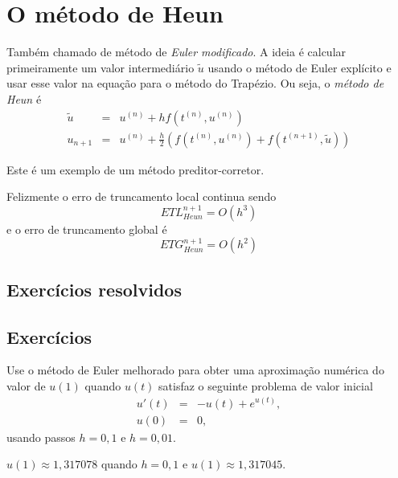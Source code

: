 \emconstrucao


\section{O método de Heun}
Também chamado de método de \emph{Euler modificado}. A ideia é calcular primeiramente um valor intermediário $\tilde{u}$ usando o método de Euler expl\'icito e usar esse valor na equação para o método do Trapézio. Ou seja, o \emph{método de Heun} é
\begin{eqnarray}
  \tilde{u} &=& u^{(n)} +   h f(t^{(n)},u^{(n)}) \\
  u_{n+1}   &=& u^{(n)} +  \frac{h}{2} \left(f(t^{(n)},u^{(n)})+f(t^{(n+1)},\tilde{u})\right)
\end{eqnarray}

Este é um exemplo de um método preditor-corretor.

Felizmente o erro de truncamento local continua sendo
$$ETL_{Heun}^{n+1}= O(h^3)$$
e o erro de truncamento global é
$$ETG_{Heun}^{n+1}= O(h^2)$$


\subsection*{Exercícios resolvidos}

\emconstrucao

\subsection*{Exercícios}

\begin{exer} Use o método de Euler melhorado para obter uma aproximação numérica do valor de $u(1)$ quando $u(t)$ satisfaz o seguinte problema de valor inicial
\begin{eqnarray*}
 u'(t)&=&-u(t)+ e^{u(t)},\\
 u(0)&=&0,
\end{eqnarray*}
usando passos $h=0,1$ e $h=0,01$.
\end{exer}
\begin{resp}
 $u(1)\approx 1,317078$ quando $h=0,1$ e $u(1)\approx 1,317045$.
\end{resp}


